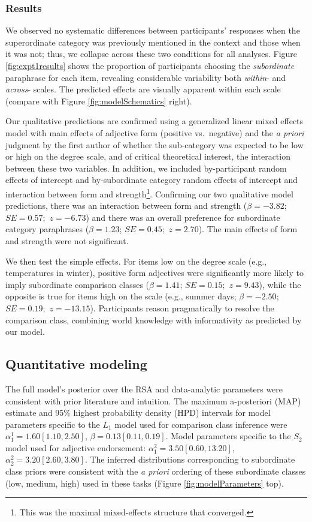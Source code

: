\documentclass[doc]{apa6}
\begin{document}
\subsubsection{Results}

We observed no systematic differences between participants' responses when the superordinate category was previously mentioned in the context and those when it was not; thus, we collapse across these two conditions for all analyses. Figure \ref{fig:expt1results} shows the proportion of participants choosing the \emph{subordinate} paraphrase for each item, revealing considerable variability both \emph{within}- and \emph{across}- scales. The predicted effects are visually apparent within each scale (compare with Figure \ref{fig:modelSchematics} right).

Our qualitative predictions are confirmed using a generalized linear mixed effects model with main effects of adjective form (positive vs.~negative) and the \emph{a priori} judgment by the first author of whether the sub-category was expected to be low or high on the degree scale, and of critical theoretical interest, the interaction between these two variables. In addition, we included by-participant random effects of intercept and by-subordinate category random effects of intercept and interaction between form and strength\footnote{This was the maximal mixed-effects structure that converged.}. Confirming our two qualitative model predictions, there was an interaction between form and strength (\(\beta = -3.82\); \(SE = 0.57;\) \(z = -6.73\)) and there was an overall preference for subordinate category paraphrases (\(\beta = 1.23\); \(SE = 0.45;\) \(z = 2.70\)). The main effects of form and strength were not significant.

We then test the simple effects. For items low on the degree scale (e.g., temperatures in winter), positive form adjectives were significantly more likely to imply subordinate comparison classes (\(\beta = 1.41\); \(SE = 0.15;\) \(z = 9.43\)), while the opposite is true for items high on the scale (e.g., summer days; \(\beta = -2.50\); \(SE = 0.19;\) \(z = -13.15\)). Participants reason pragmatically to resolve the comparison class, combining world knowledge with informativity as predicted by our model.

\subsection{Quantitative modeling}


The full model's posterior over the RSA and data-analytic parameters were consistent with prior literature and intuition. The maximum a-posteriori (MAP) estimate and 95\% highest probability density (HPD) intervals for model parameters specific to the \(L_1\) model used for comparison class inference were \(\alpha^{1}_{1} = 1.60 [1.10, 2.50]\), \(\beta = 0.13 [0.11, 0.19]\). Model parameters specific to the \(S_2\) model used for adjective endorsement: \(\alpha^{2}_{1} = 3.50 [0.60, 13.20]\), \(\alpha^{2}_{2} = 3.20 [2.60, 3.80]\). The inferred distributions corresponding to subordinate class priors were consistent with the \emph{a priori} ordering of these subordinate classes (low, medium, high) used in these tasks (Figure \ref{fig:modelParameters} top).
\end{document}

